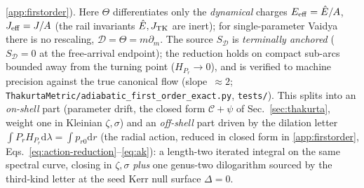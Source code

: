 \documentclass[12pt]{iopart}
\newcommand{\Ehat}{\hat E}
\newcommand{\dd}{\mathrm{d}}
\begin{document}
\ref{app:firstorder}). Here $\Theta$ differentiates only the \emph{dynamical}
charges $E_{\rm eff}=\Ehat/A$, $J_{\rm eff}=J/A$ (the rail invariants $\Ehat,J_{\rm TK}$
are inert); for single-parameter Vaidya there is no rescaling, $\mathcal D=\Theta=m\partial_m$.
The source $S_{\mathcal D}$ is \emph{terminally anchored} ($S_{\mathcal D}=0$ at the
free-arrival endpoint); the reduction holds on compact sub-arcs bounded away from the
turning point ($H_{P_r}\to0$), and is verified to machine precision against the true
canonical flow (slope~$\approx2$;
\texttt{ThakurtaMetric/adiabatic\_first\_order\_exact.py}, \texttt{tests/}). This splits
into an \emph{on-shell} part (parameter drift, the closed form $\mathcal C+\psi$ of
Sec.~\ref{sec:thakurta}, weight one in Kleinian $\zeta,\sigma$) and an \emph{off-shell}
part driven by the dilation letter $\int P_r H_{P_r}\dd\lambda=\int p_{r0}\dd r$ (the
radial action, reduced in closed form in \ref{app:firstorder},
Eqs.~\eqref{eq:action-reduction}--\eqref{eq:ak}): a length-two iterated integral on the
same spectral curve, closing in $\zeta,\sigma$ \emph{plus} one genus-two dilogarithm
sourced by the third-kind letter at the seed Kerr null surface $\Delta=0$.
\end{document}
